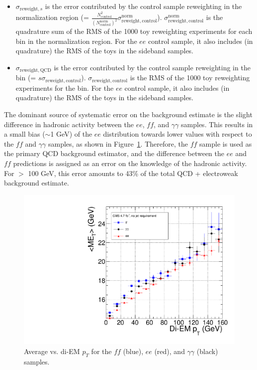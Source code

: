 \documentclass[dissertation.tex]{subfiles}
\begin{document}
\begin{itemize}
\item $\sigma_{\mathrm{reweight,}s}$ is the error contributed by the control sample reweighting in the normalization region (= $\frac{N_{\mathrm{control}}^{2}}{(N_{\mathrm{control}}^{\mathrm{norm}})^{2}}\sigma_{\mathrm{reweight,control}}^{\mathrm{norm}}$).  $\sigma_{\mathrm{reweight,control}}^{\mathrm{norm}}$ is the quadrature sum of the RMS of the 1000 toy reweighting experiments for each \MET bin in the normalization region.  For the $ee$ control sample, it also includes (in quadrature) the RMS of the toys in the sideband samples.

\item $\sigma_{\mathrm{reweight,QCD}}$ is the error contributed by the control sample reweighting in the \MET bin (= $s\sigma_{\mathrm{reweight,control}}$).  $\sigma_{\mathrm{reweight,control}}$ is the RMS of the 1000 toy reweighting experiments for the \MET bin.  For the $ee$ control sample, it also includes (in quadrature) the RMS of the toys in the sideband samples.

\end{itemize}

The dominant source of systematic error on the background estimate is the slight difference in hadronic activity between the $ee$, $\mathit{ff}$, and $\gamma\gamma$ samples.  This results in a small bias ($\sim$1 GeV) of the $ee$ \MET distribution towards lower values with respect to the $\mathit{ff}$ and $\gamma\gamma$ samples, as shown in Figure~\ref{fig:avg_MET_vs_di-EM_pT}.  Therefore, the $\mathit{ff}$ sample is used as the primary QCD background estimator, and the difference between the $ee$ and $\mathit{ff}$ predictions is assigned as an error on the knowledge of the hadronic activity.  For \MET $>$ 100 GeV, this error amounts to 43\% of the total QCD + electroweak background estimate.

\begin{figure}
	\centering
	\includegraphics[scale=0.4]{avg_MET_vs_di-EM_pT}
	\caption{Average \MET vs. di-EM $p_{T}$ for the $\mathit{ff}$ (blue), $ee$ (red), and $\gamma\gamma$ (black) samples.}
	\label{fig:avg_MET_vs_di-EM_pT}
\end{figure}
\end{document}
